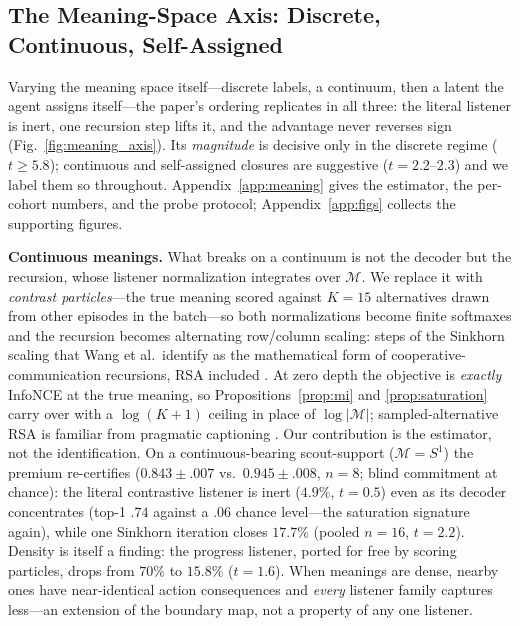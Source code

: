 \documentclass[sigconf,review,anonymous]{acmart}
\begin{document}
\subsection{The Meaning-Space Axis: Discrete, Continuous, Self-Assigned}
\label{ssec:continuous}

Varying the meaning space itself---discrete labels, a continuum, then a latent the agent assigns itself---the paper's ordering replicates in all three: the literal listener is inert, one recursion step lifts it, and the advantage never reverses sign (Fig.~\ref{fig:meaning_axis}). Its \emph{magnitude} is decisive only in the discrete regime ($t{\ge}5.8$); continuous and self-assigned closures are suggestive ($t{=}2.2$--$2.3$) and we label them so throughout. Appendix~\ref{app:meaning} gives the estimator, the per-cohort numbers, and the probe protocol; Appendix~\ref{app:figs} collects the supporting figures.

\textbf{Continuous meanings.} What breaks on a continuum is not the decoder but the recursion, whose listener normalization integrates over $\mathcal{M}$. We replace it with \emph{contrast particles}---the true meaning scored against $K{=}15$ alternatives drawn from other episodes in the batch---so both normalizations become finite softmaxes and the recursion becomes alternating row/column scaling: steps of the Sinkhorn scaling that Wang et al.\ identify as the mathematical form of cooperative-communication recursions, RSA included \cite{wang2020cooperative}. At zero depth the objective is \emph{exactly} InfoNCE \cite{oord2018representation} at the true meaning, so Propositions~\ref{prop:mi} and \ref{prop:saturation} carry over with a $\log(K{+}1)$ ceiling in place of $\log|\mathcal{M}|$; sampled-alternative RSA is familiar from pragmatic captioning \cite{cohngordon2018pragmatically}. Our contribution is the estimator, not the identification. On a continuous-bearing scout-support ($\mathcal{M}=S^1$) the premium re-certifies ($0.843\pm.007$ vs.\ $0.945\pm.008$, $n{=}8$; blind commitment at chance): the literal contrastive listener is inert ($4.9\%$, $t{=}0.5$) even as its decoder concentrates (top-1 $.74$ against a $.06$ chance level---the saturation signature again), while one Sinkhorn iteration closes $17.7\%$ (pooled $n{=}16$, $t{=}2.2$). Density is itself a finding: the progress listener, ported for free by scoring particles, drops from $70\%$ to $15.8\%$ ($t{=}1.6$). When meanings are dense, nearby ones have near-identical action consequences and \emph{every} listener family captures less---an extension of the boundary map, not a property of any one listener.
\end{document}
